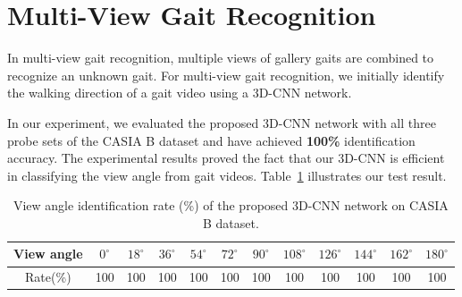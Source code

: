 \section{Multi-View Gait Recognition} \label{sec:multi_view}
In multi-view gait recognition, multiple views of gallery gaits are combined to recognize an unknown gait. For multi-view gait recognition, we initially identify the walking direction of a gait video using a 3D-CNN network. 

In our experiment, we evaluated the proposed 3D-CNN network with all three probe sets of the CASIA B dataset and have achieved \textbf{100\%} identification accuracy. The experimental results proved the fact that our 3D-CNN is efficient in classifying the view angle from gait videos. Table~\ref{table:result_wd_identification} illustrates our test result. 

\begin{table}[t]
	\centering
	\caption[View angle identification rate (\%) of the proposed 3D-CNN network on CASIA B dataset]
	{View angle identification rate (\%) of the proposed 3D-CNN network on CASIA B dataset.  \label{table:result_wd_identification}}
	
	{\begin{tabular*}{35pc}{cccc cccc cccc}\hline \noalign{\smallskip}
			View angle &${0^{\circ}}$	&${18^{\circ}}$  &${36^{\circ}}$ &${54^{\circ}}$	&${72^{\circ}}$	&${90^{\circ}}$	&${108^{\circ}}$ &${126^{\circ}}$ &${144^{\circ}}$ &${162^{\circ}}$  &${180^{\circ}}$ \\\hline \noalign{\smallskip}
			
			Rate(\%) &100 &100 &100 &100 &100 &100 &100 &100 &100 &100 &100 \\ \hline
	\end{tabular*}}{}
\end{table}



